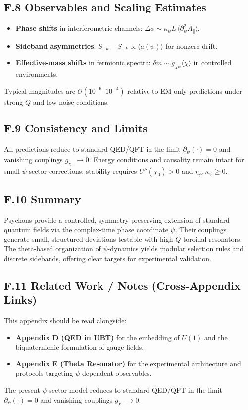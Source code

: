 \subsection*{F.8 Observables and Scaling Estimates}
\begin{itemize}
\item \textbf{Phase shifts} in interferometric channels: $\Delta\phi \sim \kappa_\psi L\, \langle \partial_\psi^2 A_\parallel\rangle$.
\item \textbf{Sideband asymmetries}: $S_{+k}-S_{-k} \propto \langle a(\psi)\rangle$ for nonzero drift.
\item \textbf{Effective-mass shifts} in fermionic spectra: $\delta m \sim g_{\chi\psi}\langle \chi\rangle$ in controlled environments.
\end{itemize}
Typical magnitudes are $\mathcal{O}(10^{-6}\text{--}10^{-4})$ relative to EM-only predictions under strong-$Q$ and low-noise conditions.

\subsection*{F.9 Consistency and Limits}
All predictions reduce to standard QED/QFT in the limit $\partial_\psi(\cdot)=0$ and vanishing couplings $g_{\chi\cdot}\rightarrow 0$. Energy conditions and causality remain intact for small $\psi$-sector corrections; stability requires $U''(\chi_0)>0$ and $\eta_\psi,\kappa_\psi\ge 0$.

\subsection*{F.10 Summary}
Psychons provide a controlled, symmetry-preserving extension of standard quantum fields via the complex-time phase coordinate $\psi$. Their couplings generate small, structured deviations testable with high-$Q$ toroidal resonators. The theta-based organization of $\psi$-dynamics yields modular selection rules and discrete sidebands, offering clear targets for experimental validation.


\subsection*{F.11 Related Work / Notes (Cross-Appendix Links)}
This appendix should be read alongside:
\begin{itemize}
\item \textbf{Appendix D (QED in UBT)} for the embedding of $U(1)$ and the biquaternionic formulation of gauge fields.
\item \textbf{Appendix E (Theta Resonator)} for the experimental architecture and protocols targeting $\psi$-dependent observables.
\end{itemize}
The present $\psi$-sector model reduces to standard QED/QFT in the limit $\partial_\psi(\cdot)=0$ and vanishing couplings $g_{\chi\cdot}\!\to\!0$.

